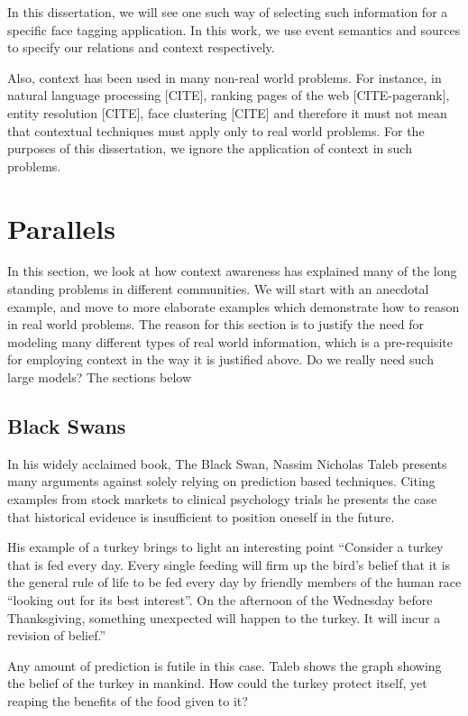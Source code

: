 In this dissertation, we will see one such way of selecting such information for a specific face tagging application. In this work, we use event semantics and sources to specify our relations and context respectively.

Also, context has been used in many non-real world problems. For instance, in natural language processing [CITE], ranking pages of the web [CITE-pagerank], entity resolution [CITE], face clustering [CITE] and therefore it must not mean that contextual techniques must apply only to real world problems. For the purposes of this dissertation, we ignore the application of context in such problems.

\section{Parallels}
In this section, we look at how context awareness has explained many of the long standing problems in different communities. We will start with an anecdotal example, and move to more elaborate examples which demonstrate how to reason in real world problems. The reason for this section is to justify the need for modeling many different types of real world information, which is a pre-requisite for employing context in the way it is justified above. Do we really need such large models? The sections below 

\subsection{Black Swans}
In his widely acclaimed book, The Black Swan, Nassim Nicholas Taleb presents many arguments against solely relying on prediction based techniques. Citing examples from stock markets to clinical psychology trials he presents the case that historical evidence is insufficient to position oneself in the future. 

His example of a turkey brings to light an interesting point ``Consider a turkey that is fed every day. Every single feeding will firm up the bird's belief that it is the general rule of life to be fed every day by friendly members of the human race ``looking out for its best interest''. On the afternoon of the Wednesday before Thanksgiving, something unexpected will happen to the turkey. It will incur a revision of belief.''

Any amount of prediction is futile in this case. Taleb shows the graph showing the belief of the turkey in mankind. How could the turkey protect itself, yet reaping the benefits of the food given to it? 

